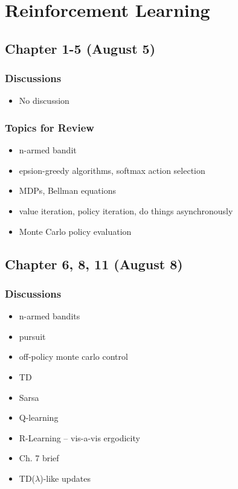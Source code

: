 \section{Reinforcement Learning}

\subsection{Chapter 1-5 (August 5)}

\subsubsection*{Discussions}
\begin{itemize}
\item No discussion
\end{itemize}

\subsubsection*{Topics for Review}
\begin{itemize}
\item n-armed bandit
\item epsion-greedy algorithms, softmax action selection
\item MDPs, Bellman equations
\item value iteration, policy iteration, do things asynchronously
\item Monte Carlo policy evaluation
\end{itemize}

\subsection{Chapter 6, 8, 11 (August 8)}

\subsubsection*{Discussions}
\begin{itemize}
\item n-armed bandits
\item pursuit
\item off-policy monte carlo control
\item TD
\item Sarsa
\item Q-learning
\item R-Learning -- vis-a-vis ergodicity
\item Ch. 7 brief
\item TD($\lambda$)-like updates
\end{itemize}

